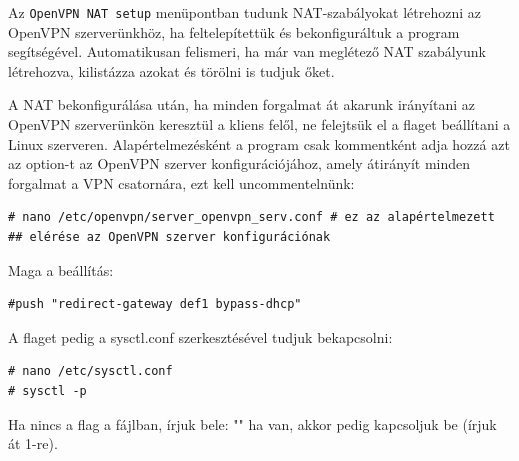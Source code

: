 Az \texttt{OpenVPN NAT setup} menüpontban tudunk NAT-szabályokat létrehozni az\\ OpenVPN szerverünkhöz, ha feltelepítettük és bekonfiguráltuk a program segítségével. Automatikusan felismeri, ha már van meglétező NAT szabályunk létrehozva, kilistázza azokat és törölni is tudjuk őket. 


A NAT bekonfigurálása után, ha minden forgalmat át akarunk irányítani az\\ OpenVPN szerverünkön keresztül a kliens felől, ne felejtsük el a \texttt{} flaget beállítani a Linux szerveren. Alapértelmezésként a program csak kommentként adja hozzá azt az option-t az OpenVPN szerver konfigurációjához, amely átirányít minden forgalmat a VPN csatornára, ezt kell uncommentelnünk:

\begin{verbatim}
# nano /etc/openvpn/server_openvpn_serv.conf # ez az alapértelmezett
## elérése az OpenVPN szerver konfigurációnak
\end{verbatim}

Maga a beállítás:
\begin{verbatim}
#push "redirect-gateway def1 bypass-dhcp"
\end{verbatim}

A  flaget pedig a sysctl.conf szerkesztésével tudjuk bekapcsolni:
\begin{verbatim}
# nano /etc/sysctl.conf
# sysctl -p
\end{verbatim}
Ha nincs a flag a fájlban, írjuk bele: "" ha van, akkor pedig kapcsoljuk be (írjuk át 1-re).


